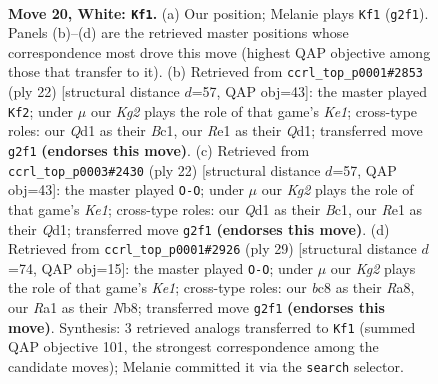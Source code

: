 \documentclass[11pt]{article}
\begin{document}
\clearpage

\begin{figure}[p]\centering
\begin{subfigure}{0.46\textwidth}\centering
\resizebox{\linewidth}{!}{%
\newchessgame
\chessboard[
  setfen={rbbqr1k1/1p3ppp/pP2p1n1/8/3p2P1/1P5B/P2P1PKP/RNBQR3 w - - 0 20},
  showmover=false,
  pgfstyle=straightmove, color=movearrow, markmove={g2-f1}
]}
\caption{}
\end{subfigure}\hfill
\begin{subfigure}{0.46\textwidth}\centering
\resizebox{\linewidth}{!}{%
\newchessgame
\chessboard[
  setfen={rn1q1rk1/pp2ppbp/4b1p1/4P3/3pNP2/6P1/PP2P1BP/R1BQK2R w KQ - 4 12},
  showmover=false,
  pgfstyle=straightmove, color=movearrow, markmove={e1-f2}
]}
\caption{}
\end{subfigure}
\\[4pt]
\begin{subfigure}{0.46\textwidth}\centering
\resizebox{\linewidth}{!}{%
\newchessgame
\chessboard[
  setfen={rn1q1rk1/pp2ppbp/4b1p1/4P3/3pNP2/6P1/PP2P1BP/R1BQK2R w KQ - 4 12},
  showmover=false,
  pgfstyle=straightmove, color=movearrow, markmove={e1-g1}
]}
\caption{}
\end{subfigure}\hfill
\begin{subfigure}{0.46\textwidth}\centering
\resizebox{\linewidth}{!}{%
\newchessgame
\chessboard[
  setfen={rn2k2r/1bppbppp/8/p2q4/B2Pp3/P3P3/1P1N1PPP/R1BQ1RK1 b kq - 3 15},
  showmover=false,
  pgfstyle=straightmove, color=movearrow, markmove={e8-g8}
]}
\caption{}
\end{subfigure}
\caption{\textbf{Move 20, White: \texttt{Kf1}.} (a) Our position; Melanie plays \texttt{Kf1} (\texttt{g2f1}). Panels (b)--(d) are the retrieved master positions whose correspondence most drove this move (highest QAP objective among those that transfer to it). (b) Retrieved from \texttt{ccrl\_top\_p0001\#2853} (ply 22) [structural distance $d$=57, QAP obj=43]: the master played \texttt{Kf2}; under $\mu$ our \emph{Kg2} plays the role of that game's \emph{Ke1}; cross-type roles: our \emph{Q}d1 as their \emph{B}c1, our \emph{R}e1 as their \emph{Q}d1; transferred move \texttt{g2f1} \textbf{(endorses this move)}. (c) Retrieved from \texttt{ccrl\_top\_p0003\#2430} (ply 22) [structural distance $d$=57, QAP obj=43]: the master played \texttt{O-O}; under $\mu$ our \emph{Kg2} plays the role of that game's \emph{Ke1}; cross-type roles: our \emph{Q}d1 as their \emph{B}c1, our \emph{R}e1 as their \emph{Q}d1; transferred move \texttt{g2f1} \textbf{(endorses this move)}. (d) Retrieved from \texttt{ccrl\_top\_p0001\#2926} (ply 29) [structural distance $d$=74, QAP obj=15]: the master played \texttt{O-O}; under $\mu$ our \emph{Kg2} plays the role of that game's \emph{Ke1}; cross-type roles: our \emph{b}c8 as their \emph{R}a8, our \emph{R}a1 as their \emph{N}b8; transferred move \texttt{g2f1} \textbf{(endorses this move)}. Synthesis: 3 retrieved analogs transferred to \texttt{Kf1} (summed QAP objective 101, the strongest correspondence among the candidate moves); Melanie committed it via the \texttt{search} selector.}
\label{fig:thought-m38}
\end{figure}
\end{document}
